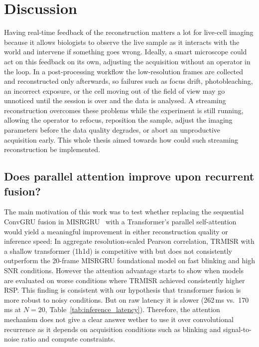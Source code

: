 \chapter{Discussion}                                                                   
\label{ch:discussion}                                                                  
                 
Having real-time feedback of the reconstruction matters a lot for live-cell imaging because
it allows biologists to observe the live sample as it interacts with the world and intervene
if something goes wrong. Ideally, a smart microscope could act on this feedback on its own,
adjusting the acquisition without an operator in the loop.
In a post-processing workflow the
low-resolution frames are collected and reconstructed only afterwards, so failures such as
focus drift, photobleaching, an incorrect exposure, or the cell moving out of the field of
view may go unnoticed until the session is over and the data is analysed. A streaming
reconstruction overcomes these problems while the experiment is still running, allowing the
operator to refocus, reposition the sample, adjust the imaging parameters before the data
quality degrades, or abort an unproductive acquisition early. This whole thesis aimed towards 
how could such streaming reconstruction be implemented.

\section{Does parallel attention improve upon recurrent fusion?}
                                                                                        
The main motivation of this work was to test whether replacing the sequential       
ConvGRU fusion in MISRGRU~\cite{resurf2024} with a Transformer's parallel
self-attention would yield a meaningful improvement in either reconstruction quality 
or inference speed:
In aggregate resolution-scaled Pearson correlation, TRMISR with a shallow transformer (1h1d) is competitive with
but does not consistently outperform the 20-frame MISRGRU foundational model on fast 
blinking and high SNR conditions. However the attention advantage starts to show when models 
are evaluated on worse conditions where TRMISR achieved consistently higher RSP. This finding is consistent
with our hypothesis that transformer fusion is more robust to noisy conditions.
But on raw latency it is slower (262\,ms vs.\ 170\,ms at $N{=}20$,
Table~\ref{tab:inference_latency}).                                                    
Therefore, the attention mechanism does not give a clear answer wether to use it over convolutional
recurrence as it depends on acquisition conditions such as blinking and signal-to-noise ratio and 
compute constraints.

